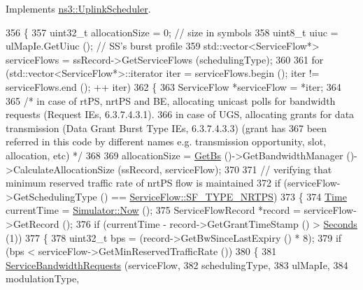 Implements \hyperlink{classns3_1_1UplinkScheduler_ab0fb68e0b8923cbec983dbcffbe7a63f}{ns3\+::\+Uplink\+Scheduler}.


\begin{DoxyCode}
356 \{
357   uint32\_t allocationSize = 0; \textcolor{comment}{// size in symbols}
358   uint8\_t uiuc = ulMapIe.GetUiuc (); \textcolor{comment}{// SS's burst profile}
359   std::vector<ServiceFlow*> serviceFlows = ssRecord->GetServiceFlows (schedulingType);
360 
361   \textcolor{keywordflow}{for} (std::vector<ServiceFlow*>::iterator iter = serviceFlows.begin (); iter != serviceFlows.end (); ++
      iter)
362     \{
363       ServiceFlow *serviceFlow = *iter;
364 
365       \textcolor{comment}{/* in case of rtPS, nrtPS and BE, allocating unicast polls for bandwidth requests (Request IEs,
       6.3.7.4.3.1).}
366 \textcolor{comment}{       in case of UGS, allocating grants for data transmission (Data Grant Burst Type IEs, 6.3.7.4.3.3)
       (grant has}
367 \textcolor{comment}{       been referred in this code by different names e.g. transmission opportunity, slot, allocation, etc) 
      */}
368 
369       allocationSize = \hyperlink{classns3_1_1UplinkScheduler_afe61b7de71d92d2dff1b135744a6ff7e}{GetBs} ()->GetBandwidthManager ()->CalculateAllocationSize (ssRecord, 
      serviceFlow);
370 
371       \textcolor{comment}{// verifying that minimum reserved traffic rate of nrtPS flow is maintained}
372       \textcolor{keywordflow}{if} (serviceFlow->GetSchedulingType () == \hyperlink{classns3_1_1ServiceFlow_a7990ba10be1e098328fd1e6382a26235a7f8577f851a9f01d159442a3a3fcdf48}{ServiceFlow::SF\_TYPE\_NRTPS})
373         \{
374           \hyperlink{namespacens3_1_1TracedValueCallback_a7ffd3e7c142ffe7c8a1d2db9b8de38ec}{Time} currentTime = \hyperlink{classns3_1_1Simulator_ac3178fa975b419f7875e7105be122800}{Simulator::Now} ();
375           ServiceFlowRecord *record = serviceFlow->GetRecord ();
376           \textcolor{keywordflow}{if} (currentTime - record->GetGrantTimeStamp () > \hyperlink{group__timecivil_ga33c34b816f8ff6628e33d5c8e9713b9e}{Seconds} (1))
377             \{
378               uint32\_t bps = (record->GetBwSinceLastExpiry () * 8);
379               \textcolor{keywordflow}{if} (bps < serviceFlow->GetMinReservedTrafficRate ())
380                 \{
381                   \hyperlink{classns3_1_1UplinkSchedulerRtps_a35d16645e1db685e5df2b5fc7527f5de}{ServiceBandwidthRequests} (serviceFlow,
382                                             schedulingType,
383                                             ulMapIe,
384                                             modulationType,

\end{DoxyCode}
